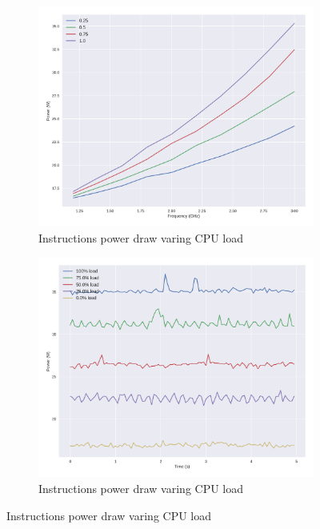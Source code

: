 \begin{figure}[H]
	\centering
	\begin{subfigure}[b]{0.45\textwidth}
		\centering
		\includegraphics[width=1\columnwidth]{experiments/figures/pw_freq_load.png}
		\caption{Instructions power draw varing CPU load}
		\label{fig:experiment_pw_load}
	\end{subfigure}
	\begin{subfigure}[b]{0.45\textwidth}
		\centering
		\includegraphics[width=1\columnwidth]{experiments/figures/pw_load.png}
		\caption{Instructions power draw varing CPU load}
		\label{fig:experiment_pw_load}
	\end{subfigure}
\end{figure}